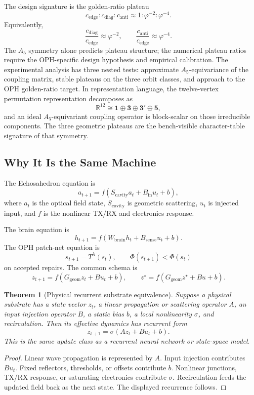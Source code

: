 \documentclass[11pt]{article}
\newtheorem{theorem}{Theorem}[section]
\theoremstyle{remark}
\theoremstyle{plain}
\newcommand{\R}{\mathbb R}
\newcommand{\diag}{\mathrm{diag}}
\newcommand{\anti}{\mathrm{anti}}
\begin{document}
The design signature is the golden-ratio plateau
\[
\boxed{
c_{\mathrm{edge}}:c_{\diag}:c_{\anti}
\approx
1:\varphi^{-2}:\varphi^{-4}.
}
\]
Equivalently,
\[
\frac{c_{\diag}}{c_{\mathrm{edge}}}\approx\varphi^{-2},
\qquad
\frac{c_{\anti}}{c_{\mathrm{edge}}}\approx\varphi^{-4}.
\]
The \(A_5\) symmetry alone predicts plateau structure; the numerical plateau ratios require the OPH-specific design hypothesis and empirical calibration. The experimental analysis has three nested tests: approximate \(A_5\)-equivariance of the coupling matrix, stable plateaus on the three orbit classes, and approach to the OPH golden-ratio target. In representation language, the twelve-vertex permutation representation decomposes as
\[
\R^{12}\cong \mathbf 1\oplus \mathbf 3\oplus \mathbf 3'\oplus \mathbf 5,
\]
and an ideal \(A_5\)-equivariant coupling operator is block-scalar on those irreducible components. The three geometric plateaus are the bench-visible character-table signature of that symmetry.

\subsection{Why It Is the Same Machine}

The Echosahedron equation is
\[
a_{t+1}
=
f(S_{\mathrm{cavity}}a_t+B_{\mathrm{in}}u_t+b),
\]
where \(a_t\) is the optical field state, \(S_{\mathrm{cavity}}\) is geometric scattering, \(u_t\) is injected input, and \(f\) is the nonlinear TX/RX and electronics response.

The brain equation is
\[
h_{t+1}
=
f(W_{\mathrm{brain}}h_t+B_{\mathrm{sense}}u_t+b).
\]
The OPH patch-net equation is
\[
s_{t+1}=T^\lambda(s_t),
\qquad
\Phi(s_{t+1})<\Phi(s_t)
\]
on accepted repairs. The common schema is
\[
\boxed{
z_{t+1}=f(G_{\mathrm{geom}}z_t+Bu_t+b),
\qquad
z^\star=f(G_{\mathrm{geom}}z^\star+Bu+b).
}
\]

\begin{theorem}[Physical recurrent substrate equivalence]
Suppose a physical substrate has a state vector \(z_t\), a linear propagation or scattering operator \(A\), an input injection operator \(B\), a static bias \(b\), a local nonlinearity \(\sigma\), and recirculation. Then its effective dynamics has recurrent form
\[
z_{t+1}=\sigma(Az_t+Bu_t+b).
\]
This is the same update class as a recurrent neural network or state-space model.
\end{theorem}

\begin{proof}
Linear wave propagation is represented by \(A\). Input injection contributes \(Bu_t\). Fixed reflectors, thresholds, or offsets contribute \(b\). Nonlinear junctions, TX/RX response, or saturating electronics contribute \(\sigma\). Recirculation feeds the updated field back as the next state. The displayed recurrence follows.
\end{proof}
\end{document}
